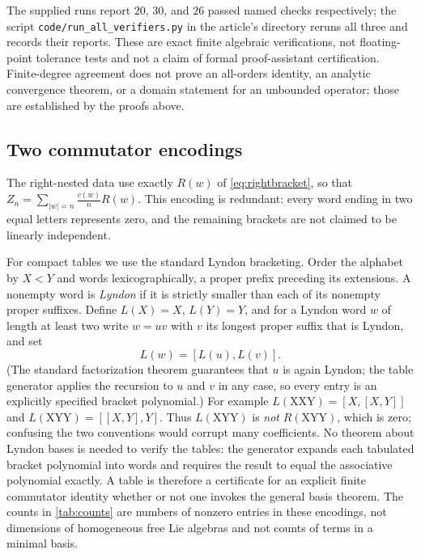 The supplied runs report $20$, $30$, and $26$ passed named checks
respectively; the script \texttt{code/run\_all\_verifiers.py} in the
article's directory reruns all three and records their reports. These are
exact finite algebraic verifications, not floating-point tolerance tests
and not a claim of formal proof-assistant certification. Finite-degree
agreement does not prove an all-orders identity, an analytic convergence
theorem, or a domain statement for an unbounded operator; those are
established by the proofs above.

\subsection{Two commutator encodings}
The right-nested data use exactly $R(w)$ of \eqref{eq:rightbracket}, so
that $Z_n=\sum_{|w|=n}\frac{c(w)}nR(w)$. This encoding is redundant: every
word ending in two equal letters represents zero, and the remaining brackets
are not claimed to be linearly independent.

For compact tables we use the standard Lyndon bracketing. Order the
alphabet by $X<Y$ and words lexicographically, a proper prefix preceding
its extensions. A nonempty word is \emph{Lyndon} if it is strictly smaller
than each of its nonempty proper suffixes. Define $L(X)=X$, $L(Y)=Y$, and
for a Lyndon word $w$ of length at least two write $w=uv$ with $v$ its
longest proper suffix that is Lyndon, and set
\begin{equation}\label{eq:lyndon}
 L(w)=[L(u),L(v)].
\end{equation}
(The standard factorization theorem guarantees that $u$ is again Lyndon;
the table generator applies the recursion to $u$ and $v$ in any case, so
every entry is an explicitly specified bracket polynomial.) For example
$L(\mathrm{XXY})=[X,[X,Y]]$ and $L(\mathrm{XYY})=[[X,Y],Y]$. Thus
$L(\mathrm{XYY})$ is \emph{not} $R(\mathrm{XYY})$, which is zero; confusing
the two conventions would corrupt many coefficients. No theorem about
Lyndon bases is needed to verify the tables: the generator expands each
tabulated bracket polynomial into words and requires the result to equal
the associative polynomial exactly. A table is therefore a certificate for
an explicit finite commutator identity whether or not one invokes the
general basis theorem. The counts in \cref{tab:counts} are numbers of
nonzero entries in these encodings, not dimensions of homogeneous free Lie
algebras and not counts of terms in a minimal basis.

